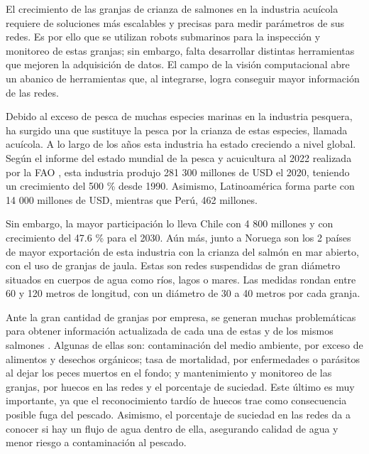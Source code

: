 

El crecimiento de las granjas de crianza de salmones en la industria acuícola requiere de soluciones más escalables y precisas para medir parámetros de sus redes. Es por ello que se utilizan robots submarinos para la inspección y monitoreo de estas granjas; sin embargo, falta desarrollar distintas herramientas que mejoren la adquisición de datos. El campo de la visión computacional abre un abanico de herramientas que, al integrarse, logra conseguir mayor información de las redes. 


Debido al exceso de pesca de muchas especies marinas en la industria pesquera, ha surgido una que sustituye la pesca por la crianza de estas especies, llamada acuícola. A lo largo de los años esta industria ha estado creciendo a nivel global. Según el informe del estado mundial de la pesca y acuicultura al 2022 realizada por la FAO \cite{FAO}, esta industria produjo 281 300 millones de USD el 2020, teniendo un crecimiento del 500 \% desde 1990. Asimismo, Latinoamérica forma parte con 14 000 millones de USD, mientras que Perú, 462 millones. 

Sin embargo, la mayor participación lo lleva Chile con 4 800 millones y con crecimiento del 47.6 \% para el 2030. Aún más, junto a Noruega son los 2 países de mayor exportación de esta industria con la crianza del salmón en mar abierto, con el uso de granjas de jaula. Estas son redes suspendidas de gran diámetro situados en cuerpos de agua como ríos, lagos o mares. Las medidas rondan entre 60 y 120 metros de longitud, con un diámetro de 30 a 40 metros por cada granja. 

Ante la gran cantidad de granjas por empresa, se generan muchas problemáticas para obtener información actualizada de cada una de estas y de los mismos salmones \cite{FAO}. Algunas de ellas son: contaminación del medio ambiente, por exceso de alimentos y desechos orgánicos; tasa de mortalidad, por enfermedades o parásitos al dejar los peces muertos en el fondo; y mantenimiento y monitoreo de las granjas, por huecos en las redes y el porcentaje de suciedad. Este último es muy importante, ya que el reconocimiento tardío de huecos trae como consecuencia posible fuga del pescado. Asimismo, el porcentaje de suciedad en las redes da a conocer si hay un flujo de agua dentro de ella, asegurando calidad de agua y menor riesgo a contaminación al pescado. 

